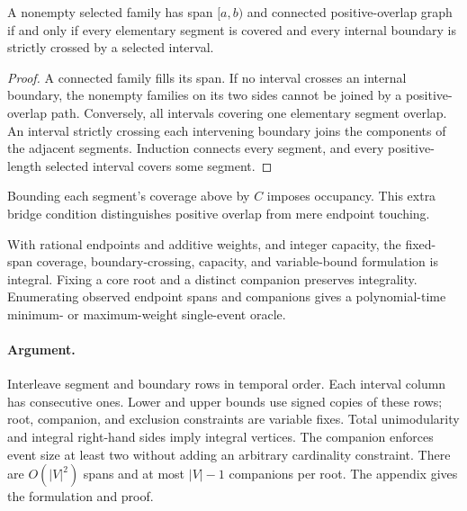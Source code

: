 \begin{lemma}
\label{lem:connectivity}
A nonempty selected family has span $[a,b)$ and connected positive-overlap
graph if and only if every elementary segment is covered and every internal
boundary is strictly crossed by a selected interval.
\end{lemma}
\begin{proof}
A connected family fills its span. If no interval crosses an internal
boundary, the nonempty families on its two sides cannot be joined by a
positive-overlap path. Conversely, all intervals covering one elementary
segment overlap. An interval strictly crossing each intervening boundary
joins the components of the adjacent segments. Induction connects every
segment, and every positive-length selected interval covers some segment.
\end{proof}
Bounding each segment's coverage above by $C$ imposes occupancy. This extra
bridge condition distinguishes positive overlap from mere endpoint touching.

\begin{theorem}
\label{thm:oracle}
With rational endpoints and additive weights, and integer capacity,
the fixed-span coverage, boundary-crossing, capacity, and variable-bound
formulation is integral. Fixing a core root and a distinct companion preserves
integrality. Enumerating observed endpoint spans and companions gives a
polynomial-time minimum- or maximum-weight single-event oracle.
\end{theorem}

\paragraph{Argument.}
Interleave segment and boundary rows in temporal order. Each interval column
has consecutive ones. Lower and upper bounds use signed copies of these rows;
root, companion, and exclusion constraints are variable fixes. Total
unimodularity and integral right-hand sides imply integral vertices. The
companion enforces event size at least two without adding an arbitrary
cardinality constraint. There are $O(|V|^2)$ spans and at most $|V|-1$
companions per root. The appendix gives the formulation and proof.

